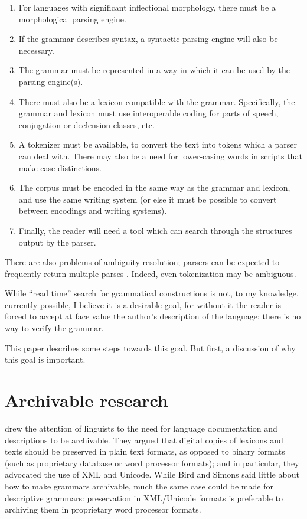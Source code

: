 \begin{enumerate}
\item For languages with significant inflectional morphology, there must be a morphological parsing engine. 
\item If the grammar describes syntax, a syntactic parsing engine will also be necessary.
\item The grammar must be represented in a way in which it can be used by the parsing engine(s).
\item There must also be a lexicon compatible with the grammar. Specifically, the grammar and lexicon must use interoperable coding for parts of speech, conjugation or declension classes, etc.
\item A tokenizer must be available, to convert the text into tokens which a parser can deal with. There may also be a need for lower-casing words in scripts that make case distinctions.
\item The corpus must be encoded in the same way as the grammar and lexicon, and use the same writing system (or else it must be possible to convert between encodings and writing systems).
\item Finally, the reader will need a tool which can search through the structures output by the parser.
\end{enumerate}
There are also problems of ambiguity resolution; parsers can be expected to frequently return multiple  parses  \citep[cf][]{Bendertv}. Indeed, even tokenization may be ambiguous.

While ``read time'' search for grammatical constructions is not, to my knowledge, currently possible, I believe it is a desirable goal, for without it the reader is forced to accept at face value the author's description of the language; there is no way to verify the grammar.

This paper describes some steps towards this goal. But first, a discussion of why this goal is important.

\section{Archivable research}
\citet{BirdEtAl2003} drew the attention of linguists to the need for language documentation and descriptions to be archivable. They argued that digital copies of lexicons and texts should be preserved in plain text formats, as opposed to binary formats (such as proprietary database or word processor formats); and in particular, they advocated the use of XML and Unicode. While Bird and Simons said little about how to make grammars archivable, much the same case could be made for descriptive grammars: preservation in XML/Unicode formats is preferable to archiving them in proprietary word processor formats. 

